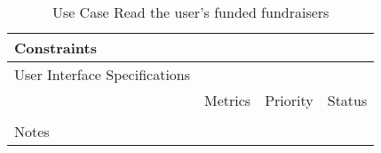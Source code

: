 \begin{table}[H]
\begin{tabularx}{\linewidth}{|l|X|X|X|}
    \hline Constraints                   & \multicolumn{3}{l|}{}                                                                                 \\

    \hline User Interface Specifications & \multicolumn{3}{l|}{}                                                                                 \\

    \hline \multirow{2}{*}{}             & Metrics                                                                           & Priority & Status \\
    \cline{2-4}                          &                                                                                   &          &        \\
    \hline Notes                         & \multicolumn{3}{l|}{}                                                                                 \\
    \hline
  \end{tabularx}
  \caption{Use Case Read the user's funded fundraisers}
  \label{tab:use_case_Read_funded_fundraisers}
\end{table}

